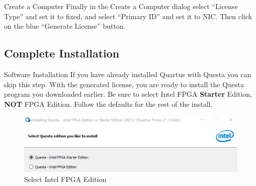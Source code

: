 \documentclass[fleqn]{beamer}
\newcommand{\quotes}[1]{``#1''}
\begin{document}
\begin{frame}{Create a Computer}
    Finally in the Create a Computer dialog select \quotes{License Type} and set it to fixed, and select \quotes{Primary ID} and set it to NIC. Then click on the blue \quotes{Generate License} button.
\end{frame}
\subsection{Complete Installation}
\begin{frame}{Software Installation}
    If you have already installed Quartus with Questa you can skip this step.
    \hline
    With the generated license, you are ready to install the Questa program you downloaded earlier. Be sure to select Intel FPGA \textbf{Starter} Edition, \textbf{NOT} FPGA Edition. Follow the defaults for the rest of the install.
    \begin{figure}
        \centering
        \includegraphics[scale=.5]{figures/questaintelfpgaedt.png}
        \caption{Select Intel FPGA Edition}
        \label{fig:my_label}
    \end{figure}
\end{frame}
\end{document}
